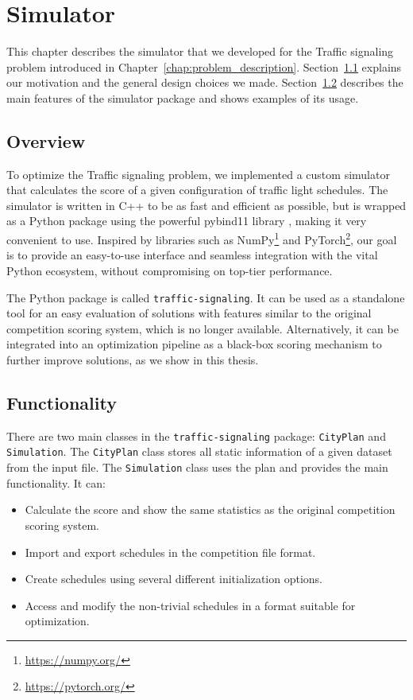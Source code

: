 \chapter{Simulator}

This chapter describes the simulator that we developed for the Traffic signaling problem introduced in Chapter~\ref{chap:problem_description}. Section~\ref{sec:overview} explains our motivation and the general design choices we made. Section~\ref{sec:functionality} describes the main features of the simulator package and shows examples of its usage. 

\section{Overview} \label{sec:overview}

To optimize the Traffic signaling problem, we implemented a custom simulator that calculates the score of a given configuration of traffic light schedules. The simulator is written in C++ to be as fast and efficient as possible, but is wrapped as a Python package using the powerful pybind11 library \cite{jakob2017pybind11}, making it very convenient to use.
Inspired by libraries such as NumPy\footnote{\url{https://numpy.org/}} and PyTorch\footnote{\url{https://pytorch.org/}}, our goal is to provide an easy-to-use interface and seamless integration with the vital Python ecosystem, without compromising on top-tier performance.

The Python package is called \verb|traffic-signaling|. It can be used as a standalone tool for an easy evaluation of solutions with features similar to the original competition scoring system, which is no longer available. Alternatively, it can be integrated into an optimization pipeline as a black-box scoring mechanism to further improve solutions, as we show in this thesis.

\section{Functionality} \label{sec:functionality}

There are two main classes in the \verb|traffic-signaling| package: \verb|CityPlan| and \verb|Simulation|. The \verb|CityPlan| class stores all static information of a given dataset from the input file. The \verb|Simulation| class uses the plan and provides the main functionality. It can:
\begin{itemize}
    \item Calculate the score and show the same statistics as the original competition scoring system.
    \item Import and export schedules in the competition file format.
    \item Create schedules using several different initialization options.
    \item Access and modify the non-trivial schedules in a format suitable for optimization.
\end{itemize} 

